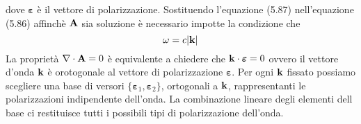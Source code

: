 dove $\boldsymbol{\varepsilon}$ \`e il vettore di polarizzazione. Sostituendo l'equazione (5.87) nell'equazione (5.86) affinch\`e $\bold{A}$ sia soluzione \`e necessario impotte la condizione che 
\begin{equation*}
	\omega = c|\bold{k}|
\end{equation*}
La propriet\`a $\nabla \cdot \bold{A} =0$ \`e equivalente a chiedere che $\bold{k} \cdot \boldsymbol{\varepsilon}=0$ ovvero il vettore d'onda $\bold{k}$ \`e orotogonale al vettore di polarizzazione $\boldsymbol{\varepsilon}$. Per ogni $\bold{k}$ fissato possiamo scegliere una base di versori $\{\boldsymbol{\varepsilon}_1,\boldsymbol{\varepsilon}_2\}$, ortogonali a $\bold{k}$, rappresentanti le polarizzazioni indipendente dell'onda. La combinazione lineare degli elementi dell base ci restituisce tutti i possibili tipi di polarizzazione dell'onda.

